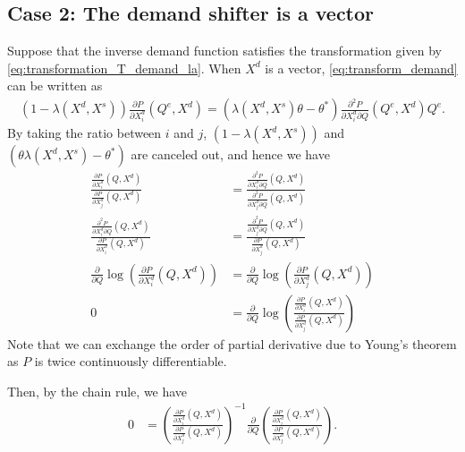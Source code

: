 \documentclass[11pt, a4paper]{article}
\theoremstyle{remark}
\begin{document}
\subsection{Case 2: The demand shifter is a vector}
Suppose that the inverse demand function satisfies the transformation given by \eqref{eq:transformation_T_demand_la}.
When $X^{d}$ is a vector, \eqref{eq:transform_demand} can be written as
\begin{align}
    (1 -  \lambda(X^{d}, X^{s}))\frac{\partial P}{\partial X^{d}_{i}}(Q^e, X^{d}) = (  \lambda(X^{d}, X^{s})\theta  - \theta^*)\frac{\partial^2 P}{\partial X^{d}_{i}\partial Q}(Q^e, X^{d})Q^e.
\end{align}
By taking the ratio between $i$ and $j$, $(1 - \lambda(X^{d}, X^{s}))$ and  $(\theta\lambda(X^{d}, X^{s}) - \theta^{*})$ are canceled out, and hence we have
\begin{align}
    \frac{\frac{\partial P}{\partial X^{d}_{i}}(Q, X^{d})}{\frac{\partial P}{\partial X^{d}_{j}}(Q, X^{d})} & = \frac{ \frac{\partial^2 P}{\partial X^{d}_{i} \partial Q}(Q, X^{d})}{\frac{\partial^2 P}{\partial X^{d}_{j} \partial Q}(Q, X^{d})}\\
    \frac{\frac{\partial^2 P}{\partial X^{d}_{i} \partial Q}(Q, X^{d})}{\frac{\partial P}{\partial X^{d}_{i}}(Q, X^{d})}  & = \frac{\frac{\partial^2 P}{\partial X^{d}_{j} \partial Q}(Q, X^{d})}{\frac{\partial P}{\partial X^{d}_{j}}(Q, X^{d})}\\ 
    \frac{\partial }{\partial Q} \log\left( \frac{\partial P}{\partial X^{d}_{i}}(Q, X^{d})\right) &= \frac{\partial }{\partial Q} \log\left( \frac{\partial P}{\partial X^{d}_{j}}(Q, X^{d})\right)\\
    0& = \frac{\partial}{\partial Q}\log\left(\frac{\frac{\partial P}{\partial X^{d}_{i}}(Q, X^{d})}{\frac{\partial P}{\partial X^{d}_{j}}(Q, X^{d})}\right)
\end{align}
Note that we can exchange the order of partial derivative due to Young's theorem as $P$ is twice continuously differentiable.

Then, by the chain rule, we have
\begin{align}
    0 & = \left(\frac{\frac{\partial P}{\partial X^{d}_{i}}(Q, X^{d})}{\frac{\partial P}{\partial X^{d}_{j}}(Q, X^{d})}\right)^{-1} \frac{\partial}{\partial Q} \left(\frac{\frac{\partial P}{\partial X^{d}_{i}}(Q, X^{d})}{\frac{\partial P}{\partial X^{d}_{j}}(Q, X^{d})}\right).
    \label{eq:derivative_separable}
\end{align}
\end{document}

